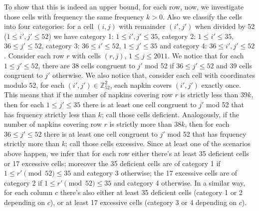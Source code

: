 \documentclass[11pt,a4paper]{article}
\begin{document}
\begin{enumerate}
	To show that this is indeed an upper bound, for each row, now, we investigate those cells with frequency the same frequency $k>0$. Also we classify the cells into four categories: for a cell $(i, j)$ with remainder $(i', j')$ when divided by 52 ($1\le i', j'\le 52$) we have category 1: $1\le i', j'\le 35$, category 2: $1\le i'\le 35$, $36\le j'\le 52$, category 3: $36\le i'\le 52$, $1\le j'\le 35$ and category 4: $36\le i', j'\le 52$. 
	Consider each row $r$ with cells $(r, j)$, $1\le j\le 2011$. 
	We notice that for each $1\le j'\le 52$, there are 38 cells congruent to $j'$ mod 52 if $36\le j'\le 52$ and 39 cells congruent to $j'$ otherwise. 
	We also notice that, consider each cell with coordinates modulo 52, for each $(i', j')\in \mathbb{Z}_{52}^2$, each napkin covers $(i', j')$ exactly once. 
	This means that if the number of napkins covering row $r$ is strictly less than $39k$, then for each $1\le j' \le 35$ there is at least one cell congruent to $j'$ mod 52 that has frquency strictly less than $k$; call those cells deficient. 
	Analogously, if the number of napkins covering row $r$ is strictly more than $38k$, then for each $36\le j' \le 52$ there is at least one cell congruent to $j'$ mod 52 that has frquency strictly more than $k$; call those cells excessive. 
	Since at least one of the scenarios above happen, we infer that for each row either there's at least 35 deficient cells or 17 excessive cells; moreover the 35 deficient cells are of category 1 if $1\le r'\pmod{52}\le 35$ and category 3 otherwise; the 17 excessive cells are of category 2 if $1\le r'\pmod{52}\le 35$ and category 4 otherwise. 
	In a similar way, for each column $c$ there's also either at least 35 deficient cells (category 1 or 2 depending on $c$), or at least 17 excessive cells (category 3 or 4 depending on $c$). 
	

\end{enumerate}
\end{document}
